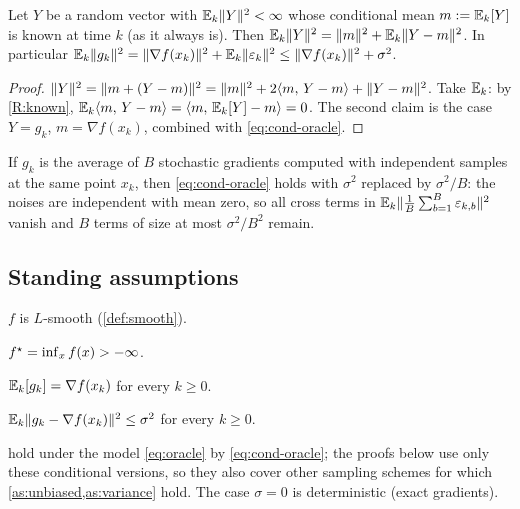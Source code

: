 \begin{lemma}\label{lem:variance}
Let $Y$ be a random vector with $\mathbb{E}_k\lVert Y\rVert^2<\infty$ whose conditional mean $m:=\mathbb{E}_k[Y]$
is known at time $k$ (as it always is). Then $\mathbb{E}_k\lVert Y\rVert^2=\lVert m\rVert^2+\mathbb{E}_k\lVert Y-m\rVert^2$.
In particular $\mathbb{E}_k\lVert g_k\rVert^2=\lVert \nabla f(x_k)\rVert^2+\mathbb{E}_k\lVert \varepsilon_k\rVert^2
\le\lVert \nabla f(x_k)\rVert^2+\sigma^2$.
\end{lemma}

\begin{proof}
$\lVert Y\rVert^2=\lVert m+(Y-m)\rVert^2=\lVert m\rVert^2+2\langle m,\, Y-m\rangle+\lVert Y-m\rVert^2$. Take $\mathbb{E}_k$: by
\ref{R:known}, $\mathbb{E}_k\langle m,\, Y-m\rangle=\langle m,\, \mathbb{E}_k[Y]-m\rangle=0$. The second claim is the case $Y=g_k$,
$m=\nabla f(x_k)$, combined with \eqref{eq:cond-oracle}.
\end{proof}

\begin{remark}\label{rem:minibatch}
If $g_k$ is the average of $B$ stochastic gradients computed with independent samples at
the same point $x_k$, then \eqref{eq:cond-oracle} holds with $\sigma^2$ replaced by
$\sigma^2/B$: the noises are independent with mean zero, so all cross terms in
$\mathbb{E}_k\lVert \frac1B\sum_{b=1}^B\varepsilon_{k,b}\rVert^2$ vanish and $B$ terms of size at most
$\sigma^2/B^2$ remain.
\end{remark}

\subsection{Standing assumptions}

\begin{assumption}[Smoothness]\label{as:smooth}
$f$ is $L$-smooth (\cref{def:smooth}).
\end{assumption}
\begin{assumption}\label{as:lower}
$f^\star=\inf_x f(x)>-\infty$.
\end{assumption}
\begin{assumption}\label{as:unbiased}
$\mathbb{E}_k[g_k]=\nabla f(x_k)$ for every $k\ge0$.
\end{assumption}
\begin{assumption}\label{as:variance}
$\mathbb{E}_k\lVert g_k-\nabla f(x_k)\rVert^2\le\sigma^2$ for every $k\ge0$.
\end{assumption}

 hold under the model \eqref{eq:oracle} by \eqref{eq:cond-oracle};
the proofs below use only these conditional versions, so they also cover other sampling
schemes for which \cref{as:unbiased,as:variance} hold. The case $\sigma=0$ is
deterministic (exact gradients).


